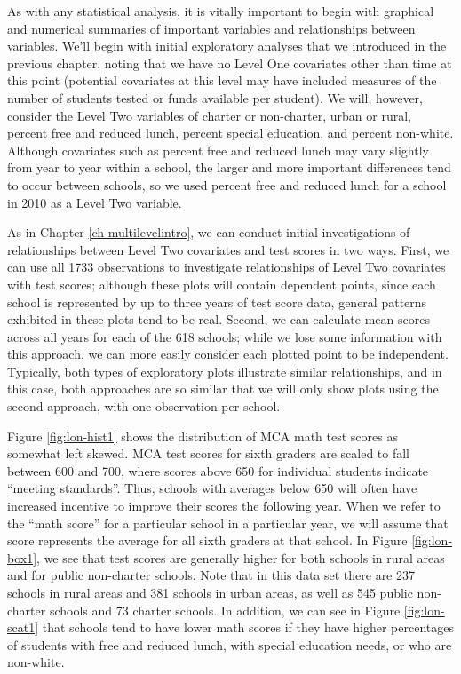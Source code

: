 \documentclass[
]{krantz}
\begin{document}
As with any statistical analysis, it is vitally important to begin with graphical and numerical summaries of important variables and relationships between variables. We'll begin with initial exploratory analyses that we introduced in the previous chapter, noting that we have no Level One covariates other than time at this point (potential covariates at this level may have included measures of the number of students tested or funds available per student). We will, however, consider the Level Two variables of charter or non-charter, urban or rural, percent free and reduced lunch, percent special education, and percent non-white. Although covariates such as percent free and reduced lunch may vary slightly from year to year within a school, the larger and more important differences tend to occur between schools, so we used percent free and reduced lunch for a school in 2010 as a Level Two variable.

As in Chapter \ref{ch-multilevelintro}, we can conduct initial investigations of relationships between Level Two covariates and test scores in two ways. First, we can use all 1733 observations to investigate relationships of Level Two covariates with test scores; although these plots will contain dependent points, since each school is represented by up to three years of test score data, general patterns exhibited in these plots tend to be real. Second, we can calculate mean scores across all years for each of the 618 schools; while we lose some information with this approach, we can more easily consider each plotted point to be independent. Typically, both types of exploratory plots illustrate similar relationships, and in this case, both approaches are so similar that we will only show plots using the second approach, with one observation per school.

Figure \ref{fig:lon-hist1} shows the distribution of MCA math test scores as somewhat left skewed. MCA test scores for sixth graders are scaled to fall between 600 and 700, where scores above 650 for individual students indicate ``meeting standards''. Thus, schools with averages below 650 will often have increased incentive to improve their scores the following year. When we refer to the ``math score'' for a particular school in a particular year, we will assume that score represents the average for all sixth graders at that school. In Figure \ref{fig:lon-box1}, we see that test scores are generally higher for both schools in rural areas and for public non-charter schools. Note that in this data set there are 237 schools in rural areas and 381 schools in urban areas, as well as 545 public non-charter schools and 73 charter schools. In addition, we can see in Figure \ref{fig:lon-scat1} that schools tend to have lower math scores if they have higher percentages of students with free and reduced lunch, with special education needs, or who are non-white.
\end{document}
